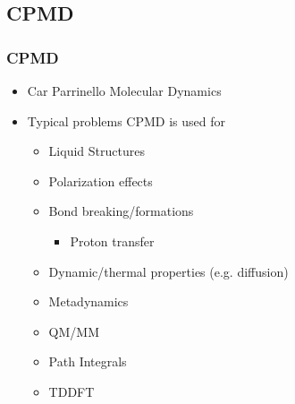 \documentclass[slidestop,mathserif,compress,xcolor=svgnames]{beamer}
\newenvironment{bblock}[0]
{
\begin{beamerboxesrounded}[upper=uppercol1,lower=lowercol1,shadow=true]}
{\end{beamerboxesrounded}}
\begin{document}
\subsection{CPMD}
\begin{frame}
  \frametitle{\small CPMD}
  \begin{bblock}{}
    \begin{itemize}
    \item Car Parrinello Molecular Dynamics
    \item Typical problems CPMD is used for
      \begin{itemize}
      \item Liquid Structures
      \item Polarization effects
      \item Bond breaking/formations
	\begin{itemize}
	\item Proton transfer
	\end{itemize}
      \item Dynamic/thermal properties (e.g. diffusion)
      \item Metadynamics
      \item QM/MM
      \item Path Integrals
      \item TDDFT
      \end{itemize}
    \end{itemize}
  \end{bblock}
\end{frame}
\end{document}
